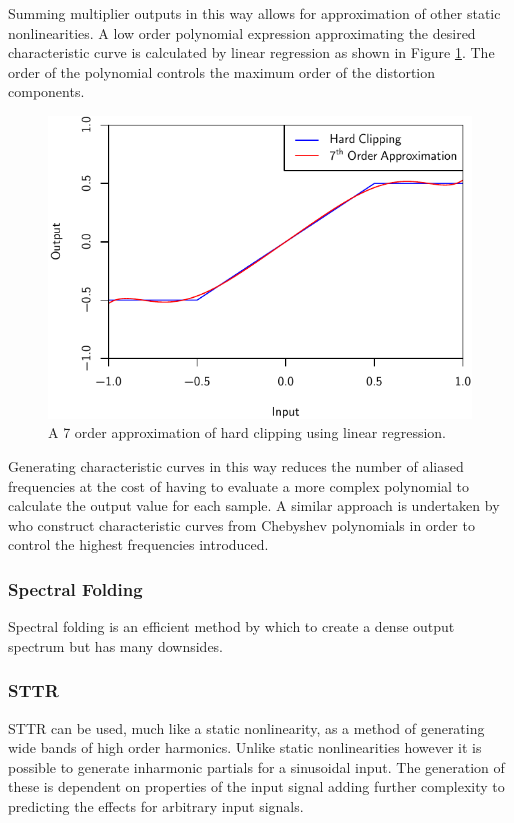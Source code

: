 			Summing multiplier outputs in this way allows for approximation of other static
			nonlinearities. A low order polynomial expression approximating the desired characteristic curve
			is calculated by linear regression as shown in Figure \ref{fig:ClippingApproximation}. The
			order of the polynomial controls the maximum order of the distortion components.

			\begin{figure}[h!]
				\centering
				\includegraphics{chapter5/Images/ClippingApproximation.pdf}
				\caption{A 7 order approximation of hard clipping using linear regression.}
				\label{fig:ClippingApproximation}
			\end{figure}

			Generating characteristic curves in this way reduces the number of aliased frequencies at the cost
			of having to evaluate a more complex polynomial to calculate the output value for each sample. A
			similar approach is undertaken by \citet{fernandez-cid2001distortion} who construct characteristic
			curves from Chebyshev polynomials in order to control the highest frequencies introduced.

		\subsubsection*{Spectral Folding}
			Spectral folding is an efficient method by which to create a dense output spectrum but has many
			downsides.

		\subsubsection*{STTR}
			STTR can be used, much like a static nonlinearity, as a method of generating wide bands of
			high order harmonics. Unlike static nonlinearities however it is possible to generate inharmonic
			partials for a sinusoidal input. The generation of these is dependent on properties of the input
			signal adding further complexity to predicting the effects for arbitrary input signals.

